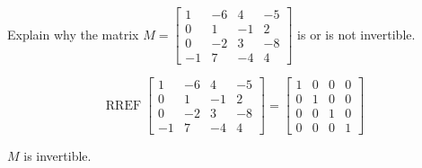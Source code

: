 
\begin{exerciseStatement}


Explain why the matrix \(M= \left[\begin{array}{cccc}
1 & -6 & 4 & -5 \\
0 & 1 & -1 & 2 \\
0 & -2 & 3 & -8 \\
-1 & 7 & -4 & 4
\end{array}\right] \) is or is not invertible.


\end{exerciseStatement}
    
\begin{exerciseAnswer} 


\[\operatorname{RREF} \left[\begin{array}{cccc}
1 & -6 & 4 & -5 \\
0 & 1 & -1 & 2 \\
0 & -2 & 3 & -8 \\
-1 & 7 & -4 & 4
\end{array}\right] = \left[\begin{array}{cccc}
1 & 0 & 0 & 0 \\
0 & 1 & 0 & 0 \\
0 & 0 & 1 & 0 \\
0 & 0 & 0 & 1
\end{array}\right] \]

\(M\) is invertible.
\end{exerciseAnswer}
    
